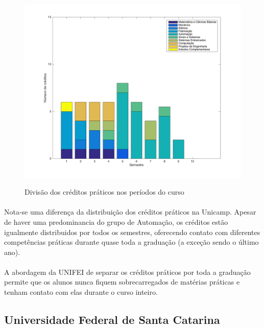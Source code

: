 \documentclass[12pt]{article} %
\begin{document}
\begin{figure}[H]
\centering
\includegraphics[scale=0.3]{pictures/graficoFei.png}\\
\caption{Divisão dos créditos práticos nos períodos do curso}

\end{figure}

\paragraph{} Nota-se uma diferença da distribuição dos créditos práticos na Unicamp. Apesar de haver uma predominancia do grupo de Automação, os créditos estão igualmente distribuidos por todos os semestres, oferecendo contato com diferentes competências práticas durante quase toda a graduação (a exceção sendo o último ano).

\paragraph{} A abordagem da UNIFEI de separar os créditos práticos por toda a graduação permite que os alunos nunca fiquem sobrecarregados de matérias práticas e tenham contato com elas durante o curso inteiro.


\subsection{Universidade Federal de Santa Catarina}
\end{document}
